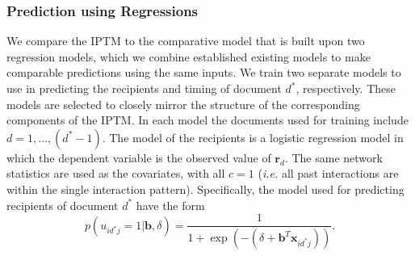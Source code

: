 \documentclass[twoside]{article}
\begin{document}
     \subsubsection{Prediction using Regressions} \label{subsubsec: Prediction using Regressions}
     We compare the IPTM to the comparative model that is built upon two regression models, which we combine established existing models to make comparable predictions using the same inputs. We train two separate models to use in predicting the recipients and timing of document $d^*$, respectively. These models are selected to closely mirror the structure of the corresponding components of the IPTM. In each model the documents used for training include $d=1,\ldots, (d^*-1)$. The model of the recipients is a logistic regression model in which the dependent variable is the observed value of $\boldsymbol{r}_{d}$. The same network statistics are used as the covariates, with all $c=1$ (\textit{i.e. } all past interactions are within the single interaction pattern). Specifically, the model used for predicting recipients of document $d^*$ have the form 
     \begin{equation*}
     p(u_{id^*j}=1|\boldsymbol{b}, \delta)=\frac{1}{1+\exp\left(-(\delta+\boldsymbol{b}^T\boldsymbol{x}_{id^*j})\right)}.
     \label{eqn:predrec}
     \end{equation*}
     
\end{document}
